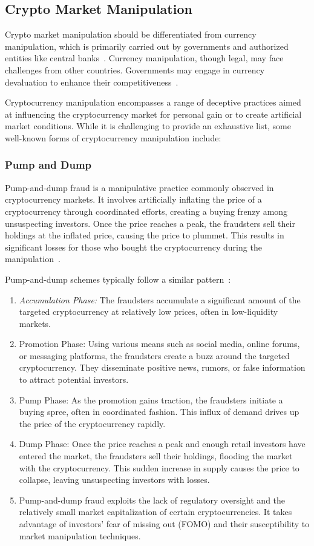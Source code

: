 \subsection{Crypto Market Manipulation}
Crypto market manipulation should be differentiated from currency manipulation, which is primarily carried out by governments and authorized entities
like central banks~\cite{goldstein2018currency}. Currency manipulation, though legal, may face challenges from other countries. Governments may engage
in currency devaluation to enhance their competitiveness~\cite{goldstein2018currency}.

Cryptocurrency manipulation encompasses a range of deceptive practices aimed at influencing the cryptocurrency market for personal gain or to create
artificial market conditions. While it is challenging to provide an exhaustive list, some well-known forms of cryptocurrency manipulation include:

\subsubsection{Pump and Dump}
Pump-and-dump fraud is a manipulative practice commonly observed in cryptocurrency markets. It involves artificially inflating the price of a
cryptocurrency through coordinated efforts, creating a buying frenzy among unsuspecting investors. Once the price reaches a peak, the fraudsters
sell their holdings at the inflated price, causing the price to plummet. This results in significant losses for those who bought the cryptocurrency
during the manipulation~\cite{karim2018manipulation}.

Pump-and-dump schemes typically follow a similar pattern~\cite{cheah2015pump}:

\begin{enumerate}
    \item \textit{Accumulation Phase:} The fraudsters accumulate a significant amount of the targeted cryptocurrency at relatively low prices, often in
    low-liquidity markets.
    \item Promotion Phase: Using various means such as social media, online forums, or messaging platforms, the fraudsters create a buzz around the
    targeted cryptocurrency. They disseminate positive news, rumors, or false information to attract potential investors.
    \item Pump Phase: As the promotion gains traction, the fraudsters initiate a buying spree, often in coordinated fashion. This influx of demand
    drives up the price of the cryptocurrency rapidly.
    \item Dump Phase: Once the price reaches a peak and enough retail investors have entered the market, the fraudsters sell their holdings, flooding
    the market with the cryptocurrency. This sudden increase in supply causes the price to collapse, leaving unsuspecting investors with losses.
    \item Pump-and-dump fraud exploits the lack of regulatory oversight and the relatively small market capitalization of certain cryptocurrencies.
    It takes advantage of investors' fear of missing out (FOMO) and their susceptibility to market manipulation techniques.
\end{enumerate}

